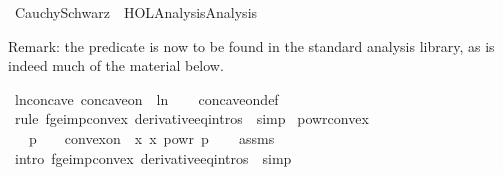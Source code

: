 %
\begin{isabellebody}%
%
%
\isadelimtheory
%
\endisadelimtheory
%
\isatagtheory
{}\isamarkupfalse%
\ CauchySchwarz\ \ {\isachardoublequoteopen}HOL{\isacharminus}{\kern0pt}Analysis{\isachardot}{\kern0pt}Analysis{\isachardoublequoteclose}\isanewline
{}%
\endisatagtheory
{\isafoldtheory}%
%
\isadelimtheory
%
\endisadelimtheory
%
\begin{isamarkuptext}%
Remark: the predicate  is now to be found in the standard analysis library, 
as is indeed much of the material below.%
\end{isamarkuptext}\isamarkuptrue%
\isamarkupfalse%
\ ln{\isacharunderscore}{\kern0pt}concave{\isacharcolon}{\kern0pt}\ {\isachardoublequoteopen}concave{\isacharunderscore}{\kern0pt}on\ {\isacharbraceleft}{\kern0pt}{}{\isacharless}{\kern0pt}{\isachardot}{\kern0pt}{\isachardot}{\kern0pt}{\isacharbraceright}{\kern0pt}\ ln{\isachardoublequoteclose}\isanewline
%
\isadelimproof
\ \ %
\endisadelimproof
%
\isatagproof
{}\isamarkupfalse%
\ concave{\isacharunderscore}{\kern0pt}on{\isacharunderscore}{\kern0pt}def\isanewline
\ \ \isamarkupfalse%
\ {\isacharparenleft}{\kern0pt}rule\ f{\isacharprime}{\kern0pt}{\isacharprime}{\kern0pt}{\isacharunderscore}{\kern0pt}ge{}{\isacharunderscore}{\kern0pt}imp{\isacharunderscore}{\kern0pt}convex\ derivative{\isacharunderscore}{\kern0pt}eq{\isacharunderscore}{\kern0pt}intros\ {\isacharbar}{\kern0pt}\ simp{\isacharparenright}{\kern0pt}{\isacharplus}{\kern0pt}%
\endisatagproof
{\isafoldproof}%
%
\isadelimproof
\isanewline
%
\endisadelimproof
\isanewline
{}\isamarkupfalse%
\ powr{\isacharunderscore}{\kern0pt}convex{\isacharcolon}{\kern0pt}\isanewline
\ \ \ {\isachardoublequoteopen}p\ {\isasymge}\ {}{\isachardoublequoteclose}\ \ {\isachardoublequoteopen}convex{\isacharunderscore}{\kern0pt}on\ {\isacharbraceleft}{\kern0pt}{}{\isacharless}{\kern0pt}{\isachardot}{\kern0pt}{\isachardot}{\kern0pt}{\isacharbraceright}{\kern0pt}\ {\isacharparenleft}{\kern0pt}{\isasymlambda}x{\isachardot}{\kern0pt}\ x\ powr\ p{\isacharparenright}{\kern0pt}{\isachardoublequoteclose}\isanewline
%
\isadelimproof
\ \ %
\endisadelimproof
%
\isatagproof
{}\isamarkupfalse%
\ assms\isanewline
\ \ \isamarkupfalse%
\ {\isacharparenleft}{\kern0pt}intro\ f{\isacharprime}{\kern0pt}{\isacharprime}{\kern0pt}{\isacharunderscore}{\kern0pt}ge{}{\isacharunderscore}{\kern0pt}imp{\isacharunderscore}{\kern0pt}convex\ derivative{\isacharunderscore}{\kern0pt}eq{\isacharunderscore}{\kern0pt}intros\ {\isacharbar}{\kern0pt}\ simp{\isacharparenright}{\kern0pt}{\isacharplus}{\kern0pt}%

\end{isabellebody}
